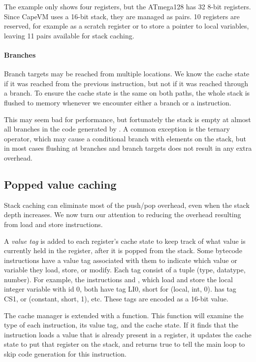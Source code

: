 The example only shows four registers, but the ATmega128 has 32 8-bit registers. Since CapeVM uses a 16-bit stack, they are managed as pairs. 10 registers are reserved, for example as a scratch register or to store a pointer to local variables, leaving 11 pairs available for stack caching.

\paragraph{Branches} Branch targets may be reached from multiple locations. We know the cache state if it was reached from the previous instruction, but not if it was reached through a branch. To ensure the cache state is the same on both paths, the whole stack is flushed to memory whenever we encounter either a branch or a  instruction. 

This may seem bad for performance, but fortunately the stack is empty at almost all branches in the code generated by . A common exception is the ternary  operator, which may cause a conditional branch with elements on the stack, but in most cases flushing at branches and branch targets does not result in any extra overhead.

\subsection{Popped value caching}
\label{sec-optimisations-popped-value-caching}


Stack caching can eliminate most of the push/pop overhead, even when the stack depth increases. We now turn our attention to reducing the overhead resulting from load and store instructions.

A \emph{value tag} is added to each register's cache state to keep track of what value is currently held in the register, after it is popped from the stack. Some bytecode instructions have a value tag associated with them to indicate which value or variable they load, store, or modify. Each tag consist of a tuple (type, datatype, number). For example, the instructions  and , which load and store the local integer variable with id 0, both have tag LI0, short for (local, int, 0).  has tag CS1, or (constant, short, 1), etc. These tags are encoded as a 16-bit value.

The cache manager is extended with a  function. This function will examine the type of each instruction, its value tag, and the cache state. If it finds that the instruction loads a value that is already present in a register, it updates the cache state to put that register on the stack, and returns true to tell the main loop to skip code generation for this instruction.

